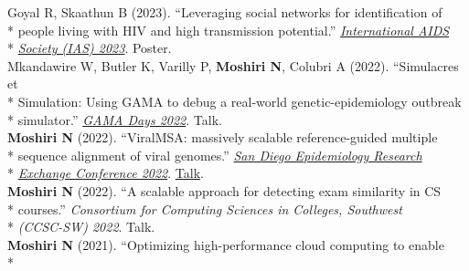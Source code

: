 \documentclass[margin,line]{res}
\begin{document}
\begin{resume}
\hspace*{9.5mm} Goyal R, Skaathun B (2023). ``Leveraging social networks for identification of\\*
\hspace*{9.5mm} people living with HIV and high transmission potential.'' \href{https://www.iasociety.org/conferences/ias2023}{\textit{International AIDS}}\\*\vspace{2mm}
\hspace*{9.5mm}\href{https://www.iasociety.org/conferences/ias2023}{\textit{Society (IAS) 2023}}. Poster.\\
\hspace*{4mm} Mkandawire W, Butler K, Varilly P, \textbf{Moshiri N}, Colubri A (2022). ``Simulacres et\\*
\hspace*{9.5mm} Simulation: Using GAMA to debug a real-world genetic-epidemiology outbreak\\*\vspace{2mm}
\hspace*{8mm} simulator.'' \href{https://gama-platform.org/Gama-Days-2022/}{\textit{GAMA Days 2022}}. Talk.\\
\hspace*{4mm} \textbf{Moshiri N} (2022). ``ViralMSA: massively scalable reference-guided multiple\\*
\hspace*{9.5mm} sequence alignment of viral genomes.'' \href{https://publichealth.sdsu.edu/epiexchange}{\textit{San Diego Epidemiology Research}}\\*\vspace{2mm}
\hspace*{8mm} \href{https://publichealth.sdsu.edu/epiexchange}{\textit{Exchange Conference 2022}}. \href{https://docs.google.com/document/d/e/2PACX-1vTufgGn-94tzBuzs1MXideQPxZApXW0EvSHIyfKQX8xdXPvwVo1H3C4WbWSgmp67BbERnjzc_tkYqdm/pub}{Talk}.\\
\hspace*{4mm} \textbf{Moshiri N} (2022). ``A scalable approach for detecting exam similarity in CS\\*
\hspace*{9.5mm} courses.'' \textit{Consortium for Computing Sciences in Colleges, Southwest}\\*\vspace{2mm}
\hspace*{8mm} \textit{(CCSC-SW) 2022}. Talk.\\
\hspace*{4mm} \textbf{Moshiri N} (2021). ``Optimizing high-performance cloud computing to enable\\*

\end{resume}
\end{document}
